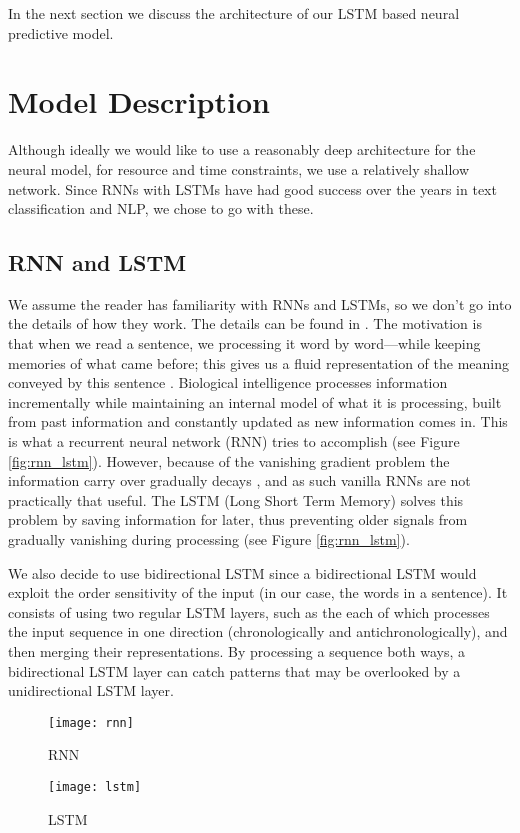\documentclass[11pt,twocolumn,letterpaper]{article}
\begin{document}
In the next section we discuss the architecture of our LSTM based neural predictive model.

\section{Model Description}
Although ideally we would like to use a reasonably deep architecture for the neural model, for resource and time constraints, we use a relatively shallow network. Since RNNs with LSTMs have had good success over the years in text classification and NLP, we chose to go with these. 

\subsection{RNN and LSTM}
We assume the reader has familiarity with RNNs and LSTMs, so we don't go into the details of how they work. The details can be found in \cite{lstm1}. The motivation is that when we read a sentence, we processing it word by word—while keeping memories of what came before; this gives us a fluid representation of the meaning conveyed by this sentence \cite{dl1}. Biological intelligence processes information incrementally while maintaining an internal model of what it is processing, built from past information and constantly updated as new information comes in. This is what a recurrent neural network (RNN) tries to accomplish (see Figure  \ref{fig:rnn_lstm}). However, because of the vanishing gradient problem the information carry over gradually decays \cite{rnn1}, and as such vanilla RNNs are not practically that useful. The LSTM (Long Short Term Memory) \cite{lstm1} solves this problem by saving information for later, thus preventing older signals from gradually vanishing during processing (see Figure \ref{fig:rnn_lstm}).

We also decide to use bidirectional LSTM \cite{dl1} since a bidirectional LSTM would exploit the order sensitivity of the input (in our case, the words in a sentence). It consists of using two regular LSTM layers, such as the each of which processes the input sequence in one direction (chronologically and antichronologically), and then merging their representations. By processing a sequence both ways, a bidirectional LSTM layer can catch patterns that may be overlooked by a unidirectional LSTM layer.

\begin{figure*}[h]
     \centering
     \begin{subfigure}[b]{\textwidth}
         \centering
         \texttt{[image: rnn]}
         \caption{RNN}
         \label{fig:rnn}
     \end{subfigure}
     \vfill
     \begin{subfigure}[b]{\textwidth}
         \centering
         \texttt{[image: lstm]}
         \caption{LSTM}
         \label{fig:lstm}
     \end{subfigure}
        \caption{RNN and LSTM}
        \label{fig:rnn_lstm}
\end{figure*} 
\end{document}
